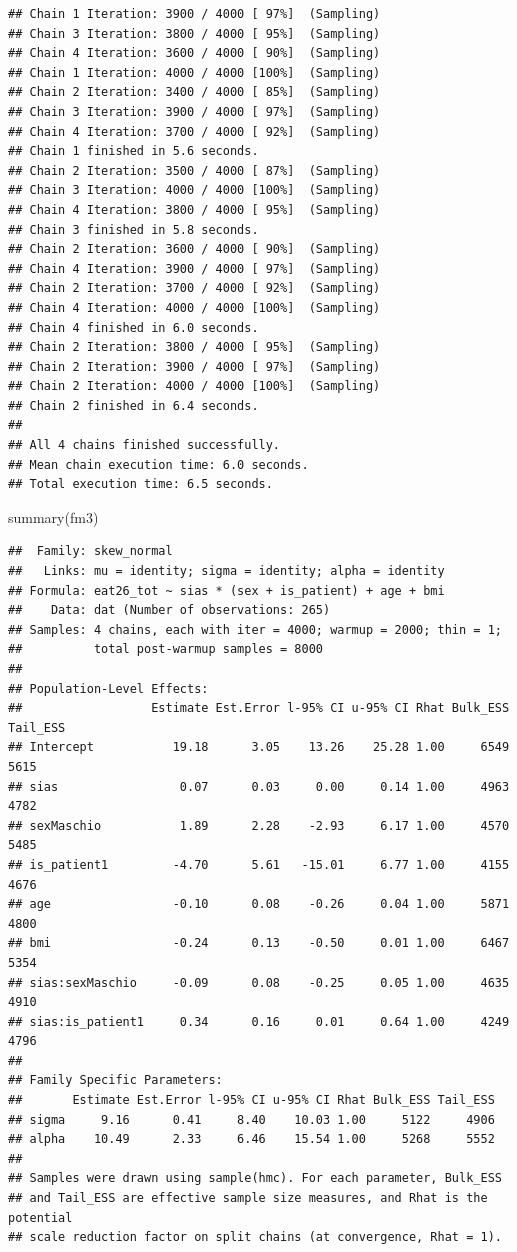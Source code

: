 \documentclass[
]{article}
\newenvironment{Shaded}{\begin{snugshade}}{\end{snugshade}}
\newcommand{\FunctionTok}[1]{\textcolor[rgb]{0.00,0.00,0.00}{#1}}
\newcommand{\NormalTok}[1]{#1}
\begin{document}
\begin{verbatim}
## Chain 1 Iteration: 3900 / 4000 [ 97%]  (Sampling) 
## Chain 3 Iteration: 3800 / 4000 [ 95%]  (Sampling) 
## Chain 4 Iteration: 3600 / 4000 [ 90%]  (Sampling) 
## Chain 1 Iteration: 4000 / 4000 [100%]  (Sampling) 
## Chain 2 Iteration: 3400 / 4000 [ 85%]  (Sampling) 
## Chain 3 Iteration: 3900 / 4000 [ 97%]  (Sampling) 
## Chain 4 Iteration: 3700 / 4000 [ 92%]  (Sampling) 
## Chain 1 finished in 5.6 seconds.
## Chain 2 Iteration: 3500 / 4000 [ 87%]  (Sampling) 
## Chain 3 Iteration: 4000 / 4000 [100%]  (Sampling) 
## Chain 4 Iteration: 3800 / 4000 [ 95%]  (Sampling) 
## Chain 3 finished in 5.8 seconds.
## Chain 2 Iteration: 3600 / 4000 [ 90%]  (Sampling) 
## Chain 4 Iteration: 3900 / 4000 [ 97%]  (Sampling) 
## Chain 2 Iteration: 3700 / 4000 [ 92%]  (Sampling) 
## Chain 4 Iteration: 4000 / 4000 [100%]  (Sampling) 
## Chain 4 finished in 6.0 seconds.
## Chain 2 Iteration: 3800 / 4000 [ 95%]  (Sampling) 
## Chain 2 Iteration: 3900 / 4000 [ 97%]  (Sampling) 
## Chain 2 Iteration: 4000 / 4000 [100%]  (Sampling) 
## Chain 2 finished in 6.4 seconds.
## 
## All 4 chains finished successfully.
## Mean chain execution time: 6.0 seconds.
## Total execution time: 6.5 seconds.
\end{verbatim}

\begin{Shaded}
\begin{Highlighting}[]
\FunctionTok{summary}\NormalTok{(fm3)}
\end{Highlighting}
\end{Shaded}

\begin{verbatim}
##  Family: skew_normal 
##   Links: mu = identity; sigma = identity; alpha = identity 
## Formula: eat26_tot ~ sias * (sex + is_patient) + age + bmi 
##    Data: dat (Number of observations: 265) 
## Samples: 4 chains, each with iter = 4000; warmup = 2000; thin = 1;
##          total post-warmup samples = 8000
## 
## Population-Level Effects: 
##                  Estimate Est.Error l-95% CI u-95% CI Rhat Bulk_ESS Tail_ESS
## Intercept           19.18      3.05    13.26    25.28 1.00     6549     5615
## sias                 0.07      0.03     0.00     0.14 1.00     4963     4782
## sexMaschio           1.89      2.28    -2.93     6.17 1.00     4570     5485
## is_patient1         -4.70      5.61   -15.01     6.77 1.00     4155     4676
## age                 -0.10      0.08    -0.26     0.04 1.00     5871     4800
## bmi                 -0.24      0.13    -0.50     0.01 1.00     6467     5354
## sias:sexMaschio     -0.09      0.08    -0.25     0.05 1.00     4635     4910
## sias:is_patient1     0.34      0.16     0.01     0.64 1.00     4249     4796
## 
## Family Specific Parameters: 
##       Estimate Est.Error l-95% CI u-95% CI Rhat Bulk_ESS Tail_ESS
## sigma     9.16      0.41     8.40    10.03 1.00     5122     4906
## alpha    10.49      2.33     6.46    15.54 1.00     5268     5552
## 
## Samples were drawn using sample(hmc). For each parameter, Bulk_ESS
## and Tail_ESS are effective sample size measures, and Rhat is the potential
## scale reduction factor on split chains (at convergence, Rhat = 1).
\end{verbatim}
\end{document}
